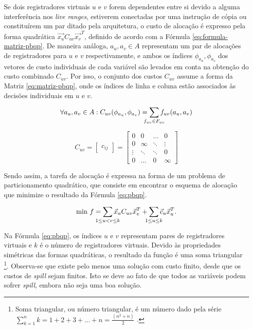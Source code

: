 \documentclass[
	12pt,				%
	openright,			%
	oneside,			%
	a4paper,			%
	tccpreliminar,			%
	]{ABNT-DC-UEL}
\begin{document}
Se dois registradores virtuais $u$ e $v$ forem dependentes entre si devido a alguma interferência nos \textit{live ranges}, estiverem conectadas por uma instrução de cópia ou constituírem um par ditado pela arquitetura, o custo de alocação é expresso pela forma quadrática $\Vec{x_u}C_{uv}\Vec{x_v}^T$, definido de acordo com a Fórmula \ref{eq:formula-matriz-pbqp}. De maneira análoga, $a_u, a_v \in A$ representam um par de alocações de registradores para $u$ e $v$ respectivamente, e ambos os índices $\phi_{a_u},\phi_{a_v}$ dos vetores de custo individuais de cada variável são levados em conta na obtenção do custo combinado $C_{uv}$. Por isso, o conjunto dos custos $C_{uv}$ assume a forma da Matriz \ref{eq:matriz-pbqp}, onde os índices de linha e coluna estão associados às decisões individuais em $u$ e $v$.

\begin{equation}
        \forall a_u, a_v \in A : C_{uv}(\phi_{a_u},\phi_{a_v}) = \sum_{\mathclap{f_{uv} \in F_{uv}}} f_{uv}(a_u,a_v)
        \label{eq:formula-matriz-pbqp}
    \end{equation}

\begin{equation}
        C_{uv} = \begin{bmatrix}
        c_{ij}
        \end{bmatrix} = \begin{bmatrix}
            0 & 0 & \ldots & 0 \\
            0 & \infty & \ddots & \vdots \\
            \vdots & \ddots & \ddots & 0 \\
            0 & \ldots & 0 & \infty
        \end{bmatrix}
        \label{eq:matriz-pbqp}
\end{equation}

Sendo assim, a tarefa de alocação é expressa na forma de um problema de particionamento quadrático, que consiste em encontrar o esquema de alocação que minimize o resultado da Fórmula \ref{eq:pbqp}.

\begin{equation}
    \text{min }f = \sum_{\mathclap{1 \leq u < v \leq k}} \Vec{x}_u C_{uv} \Vec{x}_v^T + \sum_{\mathclap{1 \leq u \leq k}} \Vec{c}_u \Vec{x}_u^T.
    \label{eq:pbqp}
\end{equation}

Na Fórmula \ref{eq:pbqp}, os índices $u$ e $v$ representam pares de registradores virtuais e $k$ é o número de registradores virtuais. Devido às propriedades simétricas das formas quadráticas, o resultado da função é uma soma triangular \footnote{Soma triangular, ou número triangular, é um número dado pela série $\sum_{k=1}^n k=1+2+3+\ldots+n=\frac{(n^2+n)}{2}$ \cite{hoggatt:74}.}. Observa-se que existe pelo menos uma solução com custo finito, desde que os custos de \textit{spill} sejam finitos. Isto se deve ao fato de que todos as variáveis podem sofrer \textit{spill}, embora não seja uma boa solução.
\end{document}
